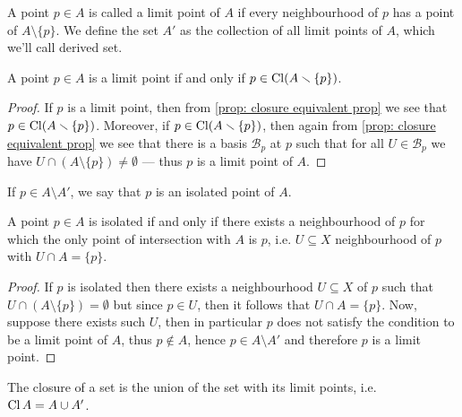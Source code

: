\begin{definition}
\label{def:limit-point-derived-set}
A point \(p \in A\) is called a limit point of \(A\) if every neighbourhood of
\(p\) has a point of \(A \setminus \{p\}\). We define the set \(A'\) as the
collection of all limit points of \(A\), which we'll call derived set.
\end{definition}

\begin{proposition}
\label{prop:equivalent-def-limit-point}
A point \(p \in A\) is a limit point if and only if \(p \in \operatorname{Cl}(A
\smallsetminus \{p\})\).
\end{proposition}

\begin{proof}
If \(p\) is a limit point, then from \cref{prop: closure equivalent prop} we see
that \(p \in \operatorname{Cl}(A \smallsetminus \{p\})\). Moreover, if \(p \in \operatorname{Cl}(A
\smallsetminus \{p\})\), then again from \cref{prop: closure equivalent prop} we
see that there is a basis \(\mathcal{B}_p\) at \(p\) such that for all \(U \in
\mathcal{B}_p\) we have \(U \cap (A \setminus \{p\}) \neq \emptyset\) --- thus
\(p\) is a limit point of \(A\).
\end{proof}

\begin{definition}
\label{def:isolated-points}
If \(p \in A \setminus A'\), we say that \(p\) is an isolated point of \(A\).
\end{definition}

\begin{proposition}\label{prop:isolated-point-equivalent-def}
A point \(p \in A\) is isolated if and only if there exists a neighbourhood of
\(p\) for which the only point of intersection with \(A\) is \(p\), i.e. \(U
\subseteq X\) neighbourhood of \(p\) with \(U \cap A = \{p\}\).
\end{proposition}

\begin{proof}
If \(p\) is isolated then there exists a neighbourhood \(U \subseteq X\) of
\(p\) such that \(U \cap (A \setminus \{p\}) = \emptyset\) but since \(p \in
U\), then it follows that \(U \cap A = \{p\}\). Now, suppose there exists such
\(U\), then in particular \(p\) does not satisfy the condition to be a limit
point of \(A\), thus \(p \notin A\), hence \(p \in A \setminus A'\) and
therefore \(p\) is a limit point.
\end{proof}

\begin{proposition}
\label{prop:closure-set-plus-limit-points}
The closure of a set is the union of the set with its limit points,
i.e. \(\operatorname{Cl} A = A \cup A'\).
\end{proposition}

